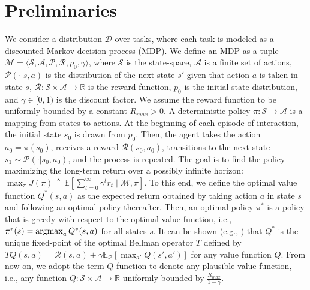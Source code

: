 \documentclass{article}
\newcommand{\argmax}{\operatornamewithlimits{argmax}}
\begin{document}
\section{Preliminaries}

We consider a distribution $\mathcal{D}$ over tasks, where each task is modeled as a discounted Markov decision process (MDP). We define an MDP as a tuple $\mathcal{M} = \langle \mathcal{S},\mathcal{A},\mathcal{P},\mathcal{R},p_0,\gamma\rangle$, where $\mathcal{S}$ is the state-space, $\mathcal{A}$ is a finite set of actions, $\mathcal{P}(\cdot | s,a)$ is the distribution of the next state $s'$ given that action $a$ is taken in state $s$, $\mathcal{R}: \mathcal{S}\times\mathcal{A}\rightarrow\mathbb{R}$ is the reward function, $p_0$ is the initial-state distribution, and $\gamma\in [0,1)$ is the discount factor. We assume the reward function to be uniformly bounded by a constant $R_{max}>0$. A deterministic policy $\pi : \mathcal{S} \rightarrow \mathcal{A}$ is a mapping from states to actions. At the beginning of each episode of interaction, the initial state $s_0$ is drawn from $p_0$. Then, the agent takes the action $a_0 = \pi(s_0)$, receives a reward $\mathcal{R}(s_0,a_0)$, transitions to the next state $s_1 \sim \mathcal{P}(\cdot | s_0,a_0)$, and the process is repeated. The goal is to find the policy maximizing the long-term return over a possibly infinite horizon: $\max_{\pi}J(\pi)\triangleq\mathbb{E}[\sum_{t=0}^{\infty} \gamma^t r_t \mid \mathcal{M},\pi]$. To this end, we define the optimal value function $Q^*(s,a)$ as the expected return obtained by taking action $a$ in state $s$ and following an optimal policy thereafter. Then, an optimal policy $\pi^*$ is a policy that is greedy with respect to the optimal value function, i.e., $\pi^*(s) = \argmax_a Q^*(s,a)$ for all states $s$. It can be shown (e.g., \cite{puterman1994markov}) that $Q^*$ is the unique fixed-point of the optimal Bellman operator $T$ defined by $TQ(s,a) = \mathcal{R}(s,a) + \gamma\mathbb{E}_{\mathcal{P}}[\max_{a'}Q(s',a')]$ for any value function $Q$. From now on, we adopt the term $Q$-function to denote any plausible value function, i.e., any function $Q : \mathcal{S}\times\mathcal{A} \rightarrow \mathbb{R}$ uniformly bounded by $\frac{R_{max}}{1-\gamma}$.
\end{document}
